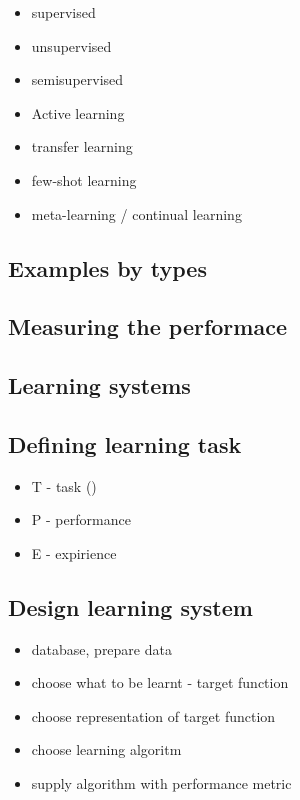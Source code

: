 \documentclass[12pt, letterpaper]{article}
\begin{document}
\begin{itemize}
    \item supervised
    \item unsupervised
    \item semisupervised
    \item Active learning
    \item transfer learning
    \item few-shot learning
    \item meta-learning / continual learning
\end{itemize}

\subsection*{}

\subsection*{Examples by types}

\subsection*{Measuring the performace}

\subsection*{Learning systems}

\subsection*{Defining learning task}

\begin{itemize}
    \item T - task ()
    \item P - performance
    \item E - expirience
\end{itemize}

\subsection*{Design learning system}

\begin{itemize}
    \item database, prepare data
    \item choose what to be learnt - target function
    \item choose representation of target function
    \item choose learning algoritm
    \item supply algorithm with performance metric
\end{itemize}
\end{document}
